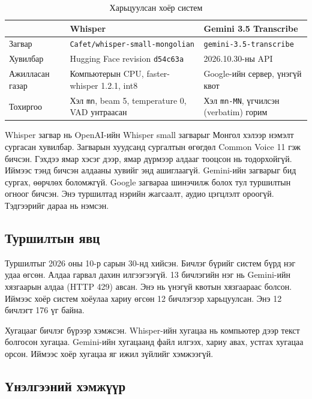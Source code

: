 \begin{table}[H]
\centering
\caption{Харьцуулсан хоёр систем}
\label{tab:stt_setup}
\begin{tabular}{|p{3.0cm}|p{5.4cm}|p{5.2cm}|}
\hline
 & \textbf{Whisper} & \textbf{Gemini 3.5 Transcribe} \\
\hline
Загвар & \texttt{Cafet/\allowbreak whisper-small-\allowbreak mongolian} \cite{cafet_whisper_small_mn} & \texttt{gemini-3.5-transcribe} \cite{google_transcribe_model} \\
\hline
Хувилбар & Hugging Face revision \texttt{d54c63a} & 2026.10.30-ны API \\
\hline
Ажилласан газар & Компьютерын CPU, faster-whisper 1.2.1, int8 & Google-ийн сервер, үнэгүй квот \\
\hline
Тохиргоо & Хэл \texttt{mn}, beam 5, temperature 0, VAD унтраасан & Хэл \texttt{mn-MN}, үгчилсэн (verbatim) горим \\
\hline
\end{tabular}
\end{table}

Whisper загвар нь OpenAI-ийн Whisper small загварыг Монгол хэлээр нэмэлт сургасан хувилбар. Загварын хуудсанд сургалтын өгөгдөл Common Voice 11 гэж бичсэн. Гэхдээ ямар хэсэг дээр, ямар дүрмээр алдааг тооцсон нь тодорхойгүй. Иймээс тэнд бичсэн алдааны хувийг энд ашиглаагүй. Gemini-ийн загварыг бид сургах, өөрчлөх боломжгүй. Google загвараа шинэчилж болох тул туршилтын огноог бичсэн. Энэ туршилтад нэрийн жагсаалт, аудио цэгцлэлт ороогүй. Тэдгээрийг дараа нь нэмсэн.

\subsection{Туршилтын явц}
\label{sec:stt-procedure}

Туршилтыг 2026 оны 10-р сарын 30-нд хийсэн. Бичлэг бүрийг систем бүрд нэг удаа өгсөн. Алдаа гарвал дахин илгээгээгүй. 13 бичлэгийн нэг нь Gemini-ийн хязгаарын алдаа (HTTP 429) авсан. Энэ нь үнэгүй квотын хязгаараас болсон. Иймээс хоёр систем хоёулаа хариу өгсөн 12 бичлэгээр харьцуулсан. Энэ 12 бичлэгт 176 үг байна.

Хугацааг бичлэг бүрээр хэмжсэн. Whisper-ийн хугацаа нь компьютер дээр текст болгосон хугацаа. Gemini-ийн хугацаанд файл илгээх, хариу авах, устгах хугацаа орсон. Иймээс хоёр хугацаа яг ижил зүйлийг хэмжээгүй.

\subsection{Үнэлгээний хэмжүүр}
\label{sec:stt-metrics}

